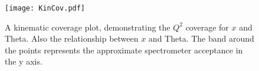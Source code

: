 \begin{figure}[h]
	\centering
	\texttt{[image: KinCov.pdf]}
	\caption{A kinematic coverage plot, demonstrating the $Q^2$ coverage for $x$ and Theta. Also the relationship between $x$ and Theta. The band around the points represents the approximate spectrometer acceptance in the y axis.}
	\label{fig:kincov}
\end{figure}